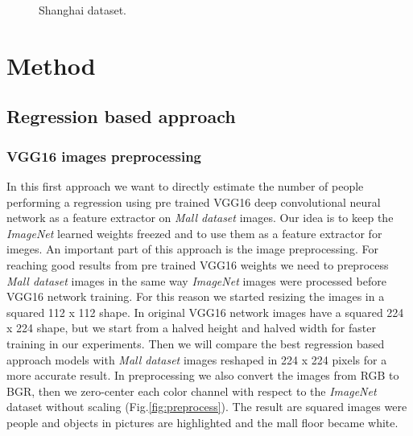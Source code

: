 \documentclass[10pt,twocolumn,letterpaper]{article}
\begin{document}
\begin{figure}[h!]%
	\centering
	\qquad
	\caption{Shanghai dataset.}
\end{figure}

\section{Method}
\subsection{Regression based approach}

\subsubsection{VGG16 images preprocessing}

In this first approach we want to directly estimate the number of people performing a regression using pre trained VGG16 deep convolutional neural network \cite{simonyan2014very} as a feature extractor on \textit{Mall dataset} images. Our idea is to keep the \textit{ImageNet} learned weights freezed and to use them as a feature extractor for imeges. An important part of this approach is the image preprocessing. For reaching good results from pre trained VGG16 weights we need to preprocess \textit{Mall dataset} images in the same way \textit{ImageNet} images were processed before VGG16 network training. For this reason we started resizing the images in a squared 112 x 112 shape. In original VGG16 network images have a squared 224 x 224 shape, but we start from a halved height and halved width for faster training in our experiments. Then we will compare the best regression based approach models with \textit{Mall dataset} images reshaped in 224 x 224 pixels for a more accurate result. In preprocessing we also convert the images from RGB to BGR, then we zero-center each color channel with respect to the \textit{ImageNet} dataset without scaling (Fig.\ref{fig:preprocess}). The result are squared images were people and objects in pictures are highlighted and the mall floor became white.
\end{document}
